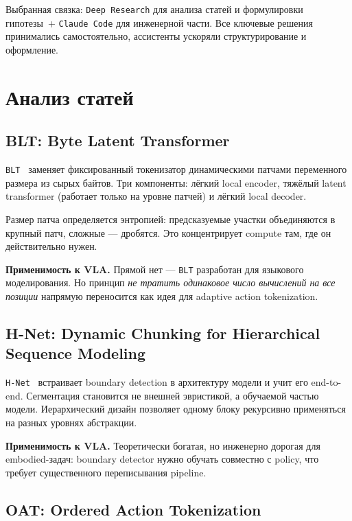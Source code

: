 \documentclass[12pt,a4paper]{article}
\begin{document}
Выбранная связка: \texttt{Deep~Research} для анализа статей и формулировки
гипотезы~+ \texttt{Claude Code} для инженерной части. Все ключевые решения
принимались самостоятельно, ассистенты ускоряли структурирование и оформление.

\section{Анализ статей}

\subsection{BLT: Byte Latent Transformer}

\texttt{BLT}~\cite{blt} заменяет фиксированный токенизатор динамическими патчами
переменного размера из сырых байтов. Три компоненты: лёгкий local encoder,
тяжёлый latent transformer (работает только на уровне патчей) и лёгкий local decoder.

Размер патча определяется энтропией: предсказуемые участки объединяются в крупный
патч, сложные --- дробятся. Это концентрирует compute там, где он действительно нужен.

\textbf{Применимость к VLA.} Прямой нет --- \texttt{BLT} разработан для языкового
моделирования. Но принцип \textit{не тратить одинаковое число вычислений на все
позиции} напрямую переносится как идея для adaptive action tokenization.

\subsection{H-Net: Dynamic Chunking for Hierarchical Sequence Modeling}

\texttt{H-Net}~\cite{hnet} встраивает boundary detection в архитектуру модели и
учит его end-to-end. Сегментация становится не внешней эвристикой, а обучаемой
частью модели. Иерархический дизайн позволяет одному блоку рекурсивно
применяться на разных уровнях абстракции.

\textbf{Применимость к VLA.} Теоретически богатая, но инженерно дорогая для
embodied-задач: boundary detector нужно обучать совместно с policy, что требует
существенного переписывания pipeline.

\subsection{OAT: Ordered Action Tokenization}
\end{document}
